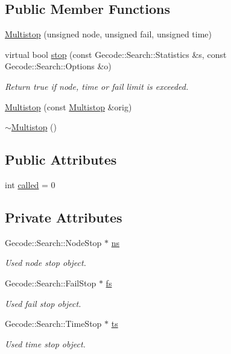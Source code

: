 \subsection*{Public Member Functions}
\begin{DoxyCompactItemize}
\item 
\hyperlink{class_multistop_a6ea7ec76f1a44b19b96813f4f772678a}{Multistop} (unsigned node, unsigned fail, unsigned time)
\item 
virtual bool \hyperlink{class_multistop_ac50ce86548b5af2aaa159da80f1aa2f6}{stop} (const Gecode\-::\-Search\-::\-Statistics \&s, const Gecode\-::\-Search\-::\-Options \&o)
\begin{DoxyCompactList}\small\item\em Return true if node, time or fail limit is exceeded. \end{DoxyCompactList}\item 
\hyperlink{class_multistop_a6ad6831344419f22b4be9cf7c093f47b}{Multistop} (const \hyperlink{class_multistop}{Multistop} \&orig)
\item 
\hyperlink{class_multistop_a2eded054110488245670f926337cd1ed}{$\sim$\-Multistop} ()
\end{DoxyCompactItemize}
\subsection*{Public Attributes}
\begin{DoxyCompactItemize}
\item 
int \hyperlink{class_multistop_a46f7c2d55ad60df362d8551fe7a983ef}{called} = 0
\end{DoxyCompactItemize}
\subsection*{Private Attributes}
\begin{DoxyCompactItemize}
\item 
Gecode\-::\-Search\-::\-Node\-Stop $\ast$ \hyperlink{class_multistop_a7fa3af8c2fa7fb4758dc77016f462386}{ns}
\begin{DoxyCompactList}\small\item\em Used node stop object. \end{DoxyCompactList}\item 
Gecode\-::\-Search\-::\-Fail\-Stop $\ast$ \hyperlink{class_multistop_a8c29d6895a4be86afd7b3ebdad00369a}{fs}
\begin{DoxyCompactList}\small\item\em Used fail stop object. \end{DoxyCompactList}\item 
Gecode\-::\-Search\-::\-Time\-Stop $\ast$ \hyperlink{class_multistop_a6cf22f443f85c506ef15bdfd494bfb2a}{ts}
\begin{DoxyCompactList}\small\item\em Used time stop object. \end{DoxyCompactList}\end{DoxyCompactItemize}


